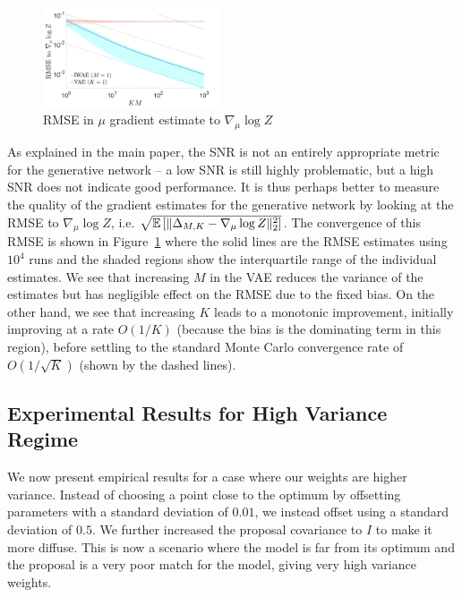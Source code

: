 \begin{figure}
	\centering
	\vspace{-15pt}
	\includegraphics[width=0.47\textwidth]{figures/tighter_bounds/mse_mu}
	\vspace{-10pt}
	\caption{RMSE in $\mu$ gradient estimate to $\nabla_{\mu} \log Z$ 
		\label{fig:snr/rmse}}
	\vspace{-8pt}
\end{figure} 
As explained in the main paper, the SNR is not an entirely appropriate metric for
the generative network -- a low SNR is still highly problematic, but a high SNR
does not indicate good performance.
It is thus perhaps better to measure
the quality of the gradient estimates for the generative network by looking at the \gls{RMSE}
to $\nabla_{\mu} \log Z$, i.e. $\sqrt{\mathbb{E} \left[\lVert\Delta_{M,K}-\nabla_{\mu} \log Z\rVert_2^2\right]}$.
The convergence of this \gls{RMSE}  is shown in
Figure~\ref{fig:snr/rmse} where the solid lines are the \gls{RMSE} estimates using $10^4$ runs 
and the shaded regions
show the interquartile range of the individual estimates. We see that increasing 
$M$ in the \gls{VAE} reduces the variance
of the estimates but has negligible effect on the \gls{RMSE} due to the fixed bias.  On the
other hand,
we see that increasing $K$ leads to a monotonic improvement, initially improving
at a rate $O(1/K)$ (because the bias is the dominating term in this region),
before settling to the standard Monte Carlo convergence rate of $O(1/\sqrt{K})$
(shown by the dashed lines).

\subsection{Experimental Results for High Variance Regime}
\label{sec:hv}

\vspace{-4pt}

We now present empirical results for a case where our weights are higher variance. Instead
of choosing a point close to the optimum by offsetting parameters with a standard deviation of $0.01$, 
we instead offset using a standard deviation of $0.5$.  We further increased the proposal covariance to $I$
to make it more diffuse.  This is now a scenario where the model is far from its optimum and the proposal
is a very poor match for the model, giving very high variance weights.


